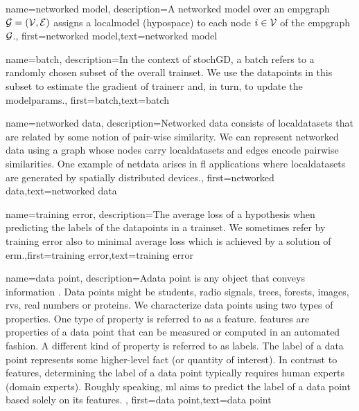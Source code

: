 {name={networked model},
  description={A networked model over an \gls{empgraph} $\mathcal{G} = \left( \mathcal{V},\mathcal{E} \right)$ assigns 
   a \gls{localmodel} (\gls{hypospace}) to each node $i \in \mathcal{V}$ of the \gls{empgraph} $\mathcal{G}$.}, 
   first={networked model},text={networked model}  
}

{
	name={batch},
	description={In the context of \gls{stochGD}, a batch refers to a randomly 
	chosen subset of the overall \gls{trainset}. We use the \gls{datapoint}s in this subset 
	to estimate the \gls{gradient} of \gls{trainerr} and, in turn, to update the \gls{modelparams}.}, 
	first={batch},text={batch}  
}

{
	name={networked data},
	description={Networked data consists of \gls{localdataset}s 
	that are related by some notion of pair-wise similarity. We can represent networked 
	data using a \gls{graph} whose nodes carry \gls{localdataset}s and edges encode 
	pairwise similarities. One example of \gls{netdata} arises in \gls{fl} applications 
	where \gls{localdataset}s are generated by spatially distributed devices.}, 
	first={networked data},text={networked data}  
}

{
	name={training error},
	description={The average \gls{loss} of a \gls{hypothesis} when 
		predicting the \gls{label}s of the \gls{datapoint}s in a \gls{trainset}. 
		We sometimes refer by training error also to minimal average \gls{loss} 
		which is achieved by a solution of \gls{erm}.},first={training error},text={training error}  
}

{name={data point},
description={Adata point is any object that conveys information \cite{coverthomas}. Data points might be 
		students, radio signals, trees, forests, images, \gls{rv}s, real numbers or proteins. We characterize data points 
		using two types of properties. One type of property is referred to as a \gls{feature}. \Gls{feature}s are properties of a 
		data point that can be measured or computed in an automated fashion. 
		A different kind of property is referred to as \gls{label}s. The \gls{label} of 
		a data point represents some higher-level fact (or quantity of interest). In 
		contrast to \gls{feature}s, determining the \gls{label} of a data point typically 
		requires human experts (domain experts). Roughly speaking, \gls{ml} aims to predict 
		the \gls{label} of a data point based solely on its \gls{feature}s. 
		}, first={data point},text={data point}  
}


